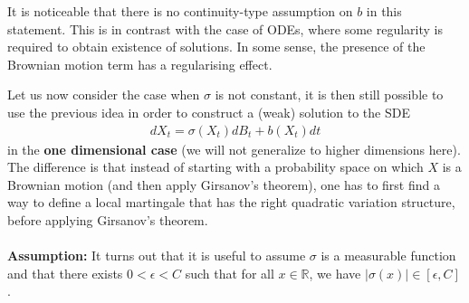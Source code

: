 \documentclass[../mainfile.tex]{subfiles}
\begin{document}
\begin{rem}It is noticeable that there is no continuity-type assumption on $b$ in this statement. This is in contrast with the case of ODEs, where some regularity is required to obtain existence of solutions. In some sense, the presence of the Brownian motion term has a regularising effect. 
\end{rem}
\newpage
Let us now consider the case when $\sigma$ is not constant, it is then still possible to use the previous idea in order to construct a (weak) solution to the SDE 
\begin{align*}
d X_t = \sigma (X_t)dB_t + b(X_t)dt
\end{align*}
in the \textbf{one dimensional case} (we will not generalize to higher dimensions here). The difference is that instead of starting with a probability space on which $X$ is a Brownian motion (and then apply Girsanov's theorem), one has to first find a way to define a local martingale that has the right quadratic variation structure, before applying Girsanov's theorem. 
\\
\\
\textbf{Assumption:} It turns out that it is useful to assume $\sigma$ is a measurable function and that there exists $0 < \epsilon < C$ such that for all $x \in \mathbb{R}$, we have $|\sigma(x)| \in [ \epsilon,C]$.
\end{document}
